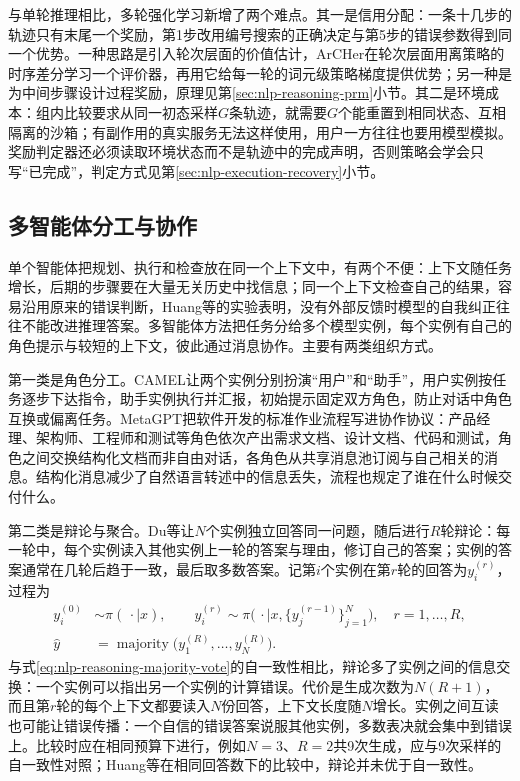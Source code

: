 与单轮推理相比，多轮强化学习新增了两个难点。其一是信用分配：一条十几步的轨迹只有末尾一个奖励，第1步改用编号搜索的正确决定与第5步的错误参数得到同一个优势。一种思路是引入轮次层面的价值估计，ArCHer在轮次层面用离策略的时序差分学习一个评价器，再用它给每一轮的词元级策略梯度提供优势；另一种是为中间步骤设计过程奖励，原理见第\ref{sec:nlp-reasoning-prm}小节。其二是环境成本：组内比较要求从同一初态采样$G$条轨迹，就需要$G$个能重置到相同状态、互相隔离的沙箱；有副作用的真实服务无法这样使用，用户一方往往也要用模型模拟。奖励判定器还必须读取环境状态而不是轨迹中的完成声明，否则策略会学会只写“已完成”，判定方式见第\ref{sec:nlp-execution-recovery}小节。

\subsection{多智能体分工与协作}
\label{sec:nlp-execution-multi-agent}

单个智能体把规划、执行和检查放在同一个上下文中，有两个不便：上下文随任务增长，后期的步骤要在大量无关历史中找信息；同一个上下文检查自己的结果，容易沿用原来的错误判断，Huang等的实验表明，没有外部反馈时模型的自我纠正往往不能改进推理答案。多智能体方法把任务分给多个模型实例，每个实例有自己的角色提示与较短的上下文，彼此通过消息协作。主要有两类组织方式。

第一类是角色分工。CAMEL让两个实例分别扮演“用户”和“助手”，用户实例按任务逐步下达指令，助手实例执行并汇报，初始提示固定双方角色，防止对话中角色互换或偏离任务。MetaGPT把软件开发的标准作业流程写进协作协议：产品经理、架构师、工程师和测试等角色依次产出需求文档、设计文档、代码和测试，角色之间交换结构化文档而非自由对话，各角色从共享消息池订阅与自己相关的消息。结构化消息减少了自然语言转述中的信息丢失，流程也规定了谁在什么时候交付什么。

第二类是辩论与聚合。Du等让$N$个实例独立回答同一问题，随后进行$R$轮辩论：每一轮中，每个实例读入其他实例上一轮的答案与理由，修订自己的答案；实例的答案通常在几轮后趋于一致，最后取多数答案。记第$i$个实例在第$r$轮的回答为$y_i^{(r)}$，过程为
\[
 \begin{aligned}
 y_i^{(0)}&\sim\pi(\,\cdot\mid x),\qquad
 y_i^{(r)}\sim\pi\bigl(\,\cdot\mid x,\{y_j^{(r-1)}\}_{j=1}^{N}\bigr),\quad r=1,\ldots,R,\\
 \hat y&=\operatorname{majority}\bigl(y_1^{(R)},\ldots,y_N^{(R)}\bigr).
 \end{aligned}
\]
与式\eqref{eq:nlp-reasoning-majority-vote}的自一致性相比，辩论多了实例之间的信息交换：一个实例可以指出另一个实例的计算错误。代价是生成次数为$N(R+1)$，而且第$r$轮的每个上下文都要读入$N$份回答，上下文长度随$N$增长。实例之间互读也可能让错误传播：一个自信的错误答案说服其他实例，多数表决就会集中到错误上。比较时应在相同预算下进行，例如$N=3$、$R=2$共9次生成，应与9次采样的自一致性对照；Huang等在相同回答数下的比较中，辩论并未优于自一致性。

